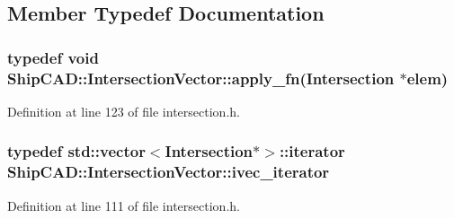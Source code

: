 \subsection{Member Typedef Documentation}
\hypertarget{classShipCAD_1_1IntersectionVector_a15b8a08f6a1b232f9825c6cbbc0fa9a9}{
\subsubsection[{apply\-\_\-fn}]{\setlength{\rightskip}{0pt plus 5cm}typedef void Ship\-C\-A\-D\-::\-Intersection\-Vector\-::apply\-\_\-fn({\bf Intersection} $\ast$elem)}}\label{classShipCAD_1_1IntersectionVector_a15b8a08f6a1b232f9825c6cbbc0fa9a9}


Definition at line 123 of file intersection.\-h.

\hypertarget{classShipCAD_1_1IntersectionVector_a02685a86dd24a49a1664a07172d709ff}{
\subsubsection[{ivec\-\_\-iterator}]{\setlength{\rightskip}{0pt plus 5cm}typedef std\-::vector$<${\bf Intersection}$\ast$$>$\-::iterator {\bf Ship\-C\-A\-D\-::\-Intersection\-Vector\-::ivec\-\_\-iterator}}}\label{classShipCAD_1_1IntersectionVector_a02685a86dd24a49a1664a07172d709ff}


Definition at line 111 of file intersection.\-h.



